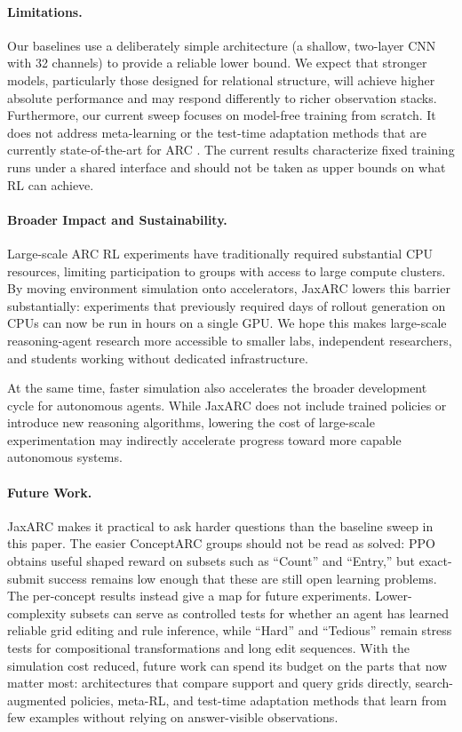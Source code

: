 \paragraph{Limitations.}
Our baselines use a deliberately simple architecture (a shallow, two-layer CNN with 32 channels) to provide a reliable lower bound. We expect that stronger models, particularly those designed for relational structure, will achieve higher absolute performance and may respond differently to richer observation stacks. Furthermore, our current sweep focuses on model-free training from scratch. It does not address meta-learning or the test-time adaptation methods that are currently state-of-the-art for ARC \citep{coleDontThrowBaby2025,akyurekSurprisingEffectivenessTesttime2025}. The current results characterize fixed training runs under a shared interface and should not be taken as upper bounds on what RL can achieve.

\paragraph{Broader Impact and Sustainability.}

Large-scale ARC RL experiments have traditionally required substantial CPU resources, limiting participation to groups with access to large compute clusters. By moving environment simulation onto accelerators, JaxARC lowers this barrier substantially: experiments that previously required days of rollout generation on CPUs can now be run in hours on a single GPU. We hope this makes large-scale reasoning-agent research more accessible to smaller labs, independent researchers, and students working without dedicated infrastructure.

At the same time, faster simulation also accelerates the broader development cycle for autonomous agents. While JaxARC does not include trained policies or introduce new reasoning algorithms, lowering the cost of large-scale experimentation may indirectly accelerate progress toward more capable autonomous systems.

\paragraph{Future Work.}

JaxARC makes it practical to ask harder questions than the baseline sweep in this paper. The easier ConceptARC groups should not be read as solved: PPO obtains useful shaped reward on subsets such as ``Count'' and ``Entry,'' but exact-submit success remains low enough that these are still open learning problems. The per-concept results instead give a map for future experiments. Lower-complexity subsets can serve as controlled tests for whether an agent has learned reliable grid editing and rule inference, while ``Hard'' and ``Tedious'' remain stress tests for compositional transformations and long edit sequences. With the simulation cost reduced, future work can spend its budget on the parts that now matter most: architectures that compare support and query grids directly, search-augmented policies, meta-RL, and test-time adaptation methods that learn from few examples without relying on answer-visible observations.
